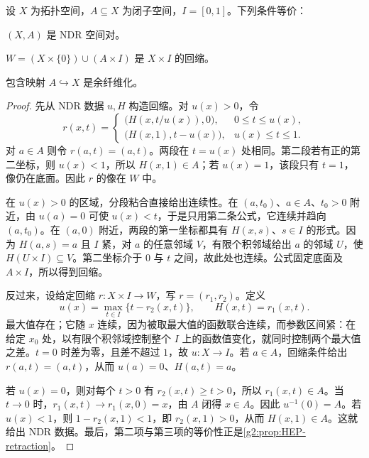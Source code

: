 \begin{theorem}\label{g2:thm:NDR-cofibration}
	设 \(X\) 为拓扑空间，\(A\subseteq X\) 为闭子空间，\(I=[0,1]\)。下列条件等价：
	\begin{equivalences}
		\item \((X,A)\) 是 NDR 空间对。
		\item \(W=(X\times\{0\})\cup(A\times I)\) 是 \(X\times I\) 的回缩。
		\item 包含映射 \(A\hookrightarrow X\) 是余纤维化。
	\end{equivalences}
\end{theorem}
\begin{proof}
	先从 NDR 数据 \(u,H\) 构造回缩。对 \(u(x)>0\)，令
	\[
		r(x,t)=
		\begin{cases}
			\bigl(H(x,t/u(x)),0\bigr),&0\le t\le u(x),\\
			\bigl(H(x,1),t-u(x)\bigr),&u(x)\le t\le1.
		\end{cases}
	\]
	对 \(a\in A\) 则令 \(r(a,t)=(a,t)\)。两段在 \(t=u(x)\) 处相同。第二段若有正的第二坐标，则 \(u(x)<1\)，所以 \(H(x,1)\in A\)；若 \(u(x)=1\)，该段只有 \(t=1\)，像仍在底面。因此 \(r\) 的像在 \(W\) 中。

	在 \(u(x)>0\) 的区域，分段粘合直接给出连续性。在 \((a,t_0)\)、\(a\in A\)、\(t_0>0\) 附近，由 \(u(a)=0\) 可使 \(u(x)<t\)，于是只用第二条公式，它连续并趋向 \((a,t_0)\)。在 \((a,0)\) 附近，两段的第一坐标都具有 \(H(x,s)\)、\(s\in I\) 的形式。因为 \(H(a,s)=a\) 且 \(I\) 紧，对 \(a\) 的任意邻域 \(V\)，有限个积邻域给出 \(a\) 的邻域 \(U\)，使 \(H(U\times I)\subseteq V\)。第二坐标介于 \(0\) 与 \(t\) 之间，故此处也连续。公式固定底面及 \(A\times I\)，所以得到回缩。

	反过来，设给定回缩 \(r:X\times I\to W\)，写 \(r=(r_1,r_2)\)。定义
	\[
		u(x)=\max_{t\in I}\{t-r_2(x,t)\},\qquad H(x,t)=r_1(x,t).
	\]
	最大值存在；它随 \(x\) 连续，因为被取最大值的函数联合连续，而参数区间紧：在给定 \(x_0\) 处，以有限个积邻域控制整个 \(I\) 上的函数值变化，就同时控制两个最大值之差。\(t=0\) 时差为零，且差不超过 \(1\)，故 \(u:X\to I\)。若 \(a\in A\)，回缩条件给出 \(r(a,t)=(a,t)\)，从而 \(u(a)=0\)、\(H(a,t)=a\)。

	若 \(u(x)=0\)，则对每个 \(t>0\) 有 \(r_2(x,t)\ge t>0\)，所以 \(r_1(x,t)\in A\)。当 \(t\to0\) 时，\(r_1(x,t)\to r_1(x,0)=x\)，由 \(A\) 闭得 \(x\in A\)。因此 \(u^{-1}(0)=A\)。若 \(u(x)<1\)，则 \(1-r_2(x,1)<1\)，即 \(r_2(x,1)>0\)，从而 \(H(x,1)\in A\)。这就给出 NDR 数据。最后，第二项与第三项的等价性正是\cref{g2:prop:HEP-retraction}。
\end{proof}

